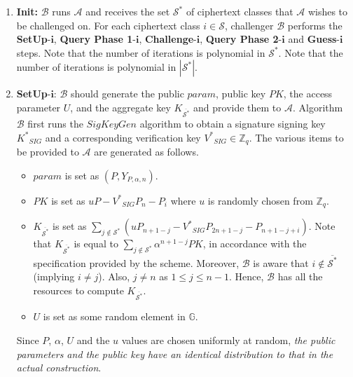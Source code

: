 \begin{enumerate}
 \item \textbf{Init:} $\mathcal{B}$ runs $\mathcal{A}$ and receives the set ${\mathcal{S}}^{*}$ of ciphertext classes that $\mathcal{A}$ wishes to be challenged on. For each ciphertext class $i\in\mathcal{S}$, challenger $\mathcal{B}$ performs the \textbf{SetUp}-$\mathbf{i}$, \textbf{Query Phase 1}-$\mathbf{i}$, \textbf{Challenge}-$\mathbf{i}$, \textbf{Query Phase 2}-$\mathbf{i}$ and \textbf{Guess}-$\mathbf{i}$ steps. Note that the number of iterations is polynomial in ${\mathcal{S}}^{*}$. Note that the number of iterations is polynomial in $|{\mathcal{S}}^{*}|$. 
 
 \item \textbf{SetUp}-$\mathbf{i}$: $\mathcal{B}$ should generate the public $param$, public key $PK$, the access parameter $U$, and the aggregate key $K_{\overline{{\mathcal{S}}^{*}}}$ and provide them to $\mathcal{A}$. Algorithm $\mathcal{B}$ first runs the $SigKeyGen$ algorithm to obtain a signature signing key ${K^{*}}_{SIG}$ and a corresponding verification key ${V^{*}}_{SIG} \in \mathbb{Z}_q$. The various items to be provided to $\mathcal{A}$ are generated as follows.
 \begin{itemize}
  \item $param$ is set as $(P,Y_{P,\alpha,n})$.
  \item $PK$ is set as $uP - {V^{*}}_{SIG}P_n - P_i$ where $u$ is randomly chosen from $\mathbb{Z}_q$.
  \item $K_{\overline{{\mathcal{S}}^{*}}}$ is set as $\sum_{j\notin{\mathcal{S}}^{*}}({u}P_{n+1-j}- {V^{*}}_{SIG}P_{2n+1-j} -P_{n+1-j+i})$. Note that $K_{\overline{{\mathcal{S}}^{*}}}$ is equal to $\sum_{j\notin{\mathcal{S}}^{*}}\alpha^{n+1-j}PK$, in accordance with the specification provided by the scheme. Moreover, $\mathcal{B}$ is aware that $i\notin \overline{{\mathcal{S}}^{*}}$ (implying $i\neq j$). Also, $j\neq n$ as $1\leq j \leq n-1$. Hence, $\mathcal{B}$ has all the resources to compute $K_{\overline{{\mathcal{S}}^{*}}}$.
  \item $U$ is set as some random element in $\mathbb{G}$.
  
 \end{itemize}
 
 Since $P$, $\alpha$, $U$ and the $u$ values are chosen uniformly at random, \emph{the public parameters and the public key have an identical distribution to that in the actual construction}.
 

\end{enumerate}
